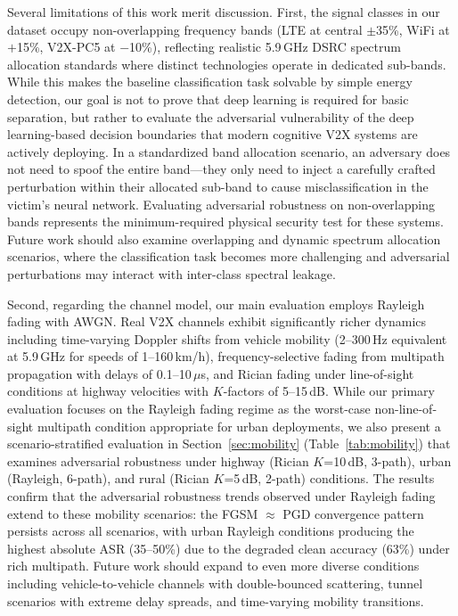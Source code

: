 \documentclass[conference]{IEEEtran}
\begin{document}
Several limitations of this work merit discussion. First, the signal classes in our dataset occupy non-overlapping frequency bands (LTE at central $\pm$35\%, WiFi at $+$15\%, V2X-PC5 at $-$10\%), reflecting realistic 5.9\,GHz DSRC spectrum allocation standards where distinct technologies operate in dedicated sub-bands. While this makes the baseline classification task solvable by simple energy detection, our goal is not to prove that deep learning is required for basic separation, but rather to evaluate the adversarial vulnerability of the deep learning-based decision boundaries that modern cognitive V2X systems are actively deploying. In a standardized band allocation scenario, an adversary does not need to spoof the entire band---they only need to inject a carefully crafted perturbation within their allocated sub-band to cause misclassification in the victim's neural network. Evaluating adversarial robustness on non-overlapping bands represents the minimum-required physical security test for these systems. Future work should also examine overlapping and dynamic spectrum allocation scenarios, where the classification task becomes more challenging and adversarial perturbations may interact with inter-class spectral leakage.

Second, regarding the channel model, our main evaluation employs Rayleigh fading with AWGN. Real V2X channels exhibit significantly richer dynamics including time-varying Doppler shifts from vehicle mobility (2--300\,Hz equivalent at 5.9\,GHz for speeds of 1--160\,km/h), frequency-selective fading from multipath propagation with delays of 0.1--10\,$\mu$s, and Rician fading under line-of-sight conditions at highway velocities with $K$-factors of 5--15\,dB. While our primary evaluation focuses on the Rayleigh fading regime as the worst-case non-line-of-sight multipath condition appropriate for urban deployments, we also present a scenario-stratified evaluation in Section~\ref{sec:mobility} (Table~\ref{tab:mobility}) that examines adversarial robustness under highway (Rician $K$=10\,dB, 3-path), urban (Rayleigh, 6-path), and rural (Rician $K$=5\,dB, 2-path) conditions. The results confirm that the adversarial robustness trends observed under Rayleigh fading extend to these mobility scenarios: the FGSM $\approx$ PGD convergence pattern persists across all scenarios, with urban Rayleigh conditions producing the highest absolute ASR (35--50\%) due to the degraded clean accuracy (63\%) under rich multipath. Future work should expand to even more diverse conditions including vehicle-to-vehicle channels with double-bounced scattering, tunnel scenarios with extreme delay spreads, and time-varying mobility transitions.
\end{document}
